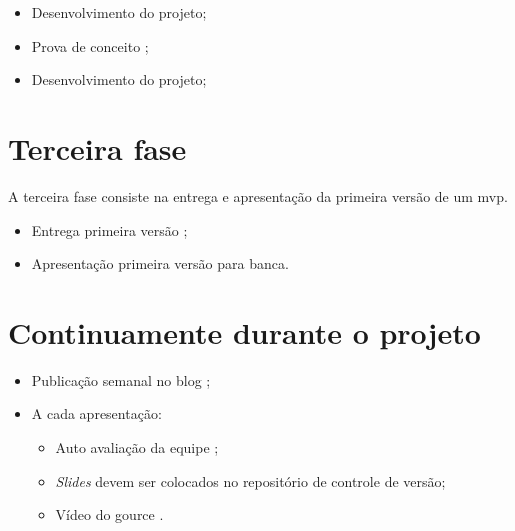 \begin{itemize}
    \item Desenvolvimento do projeto;

    \item Prova de conceito ;
    
    \item Desenvolvimento do projeto;
\end{itemize}

\section{Terceira fase}
A terceira fase consiste na entrega e apresentação da primeira versão de um \ac{mvp}.

\begin{itemize}
    \item Entrega primeira versão ;

    \item Apresentação primeira versão  para banca.
\end{itemize}

\section{Continuamente durante o projeto}

\begin{itemize}
    \item Publicação semanal no blog ;
    
    \item A cada apresentação:
      \begin{itemize}
            \item Auto avaliação da equipe ;
          
            \item \emph{Slides} devem ser colocados no repositório de controle de versão;
          
            \item Vídeo do \gls{gource} .
      \end{itemize}

       
\end{itemize}





